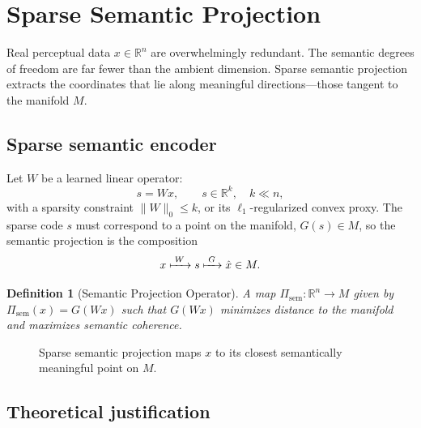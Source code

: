 \documentclass[11pt,a4paper,twocolumn]{article}
\newtheorem{definition}[theorem]{Definition}
\begin{document}

\section{Sparse Semantic Projection}

Real perceptual data $x \in \mathbb{R}^n$ are overwhelmingly redundant.
The semantic degrees of freedom are far fewer than the ambient
dimension. Sparse semantic projection extracts the coordinates that lie
along meaningful directions---those tangent to the manifold $M$.

\subsection{Sparse semantic encoder}

Let $W$ be a learned linear operator:
\[
s = W x, \qquad s \in \mathbb{R}^k, \quad k \ll n,
\]
with a sparsity constraint $\|W\|_0 \le k$, or its $\ell_1$-regularized
convex proxy. The sparse code $s$ must correspond to a point on the
manifold, $G(s) \in M$, so the semantic projection is the composition
\[
x \xmapsto{\;W\;} s \xmapsto{\;G\;} \hat{x} \in M.
\]

\begin{definition}[Semantic Projection Operator]
A map $\Pi_{\mathrm{sem}} : \mathbb{R}^n \to M$ given by
$\Pi_{\mathrm{sem}}(x) = G(Wx)$ such that $G(Wx)$ minimizes distance
to the manifold and maximizes semantic coherence.
\end{definition}

\begin{figure}[H]
\centering
{}
\caption{Sparse semantic projection maps $x$ to its closest semantically meaningful point on $M$.}
\end{figure}

\subsection{Theoretical justification}
\end{document}
